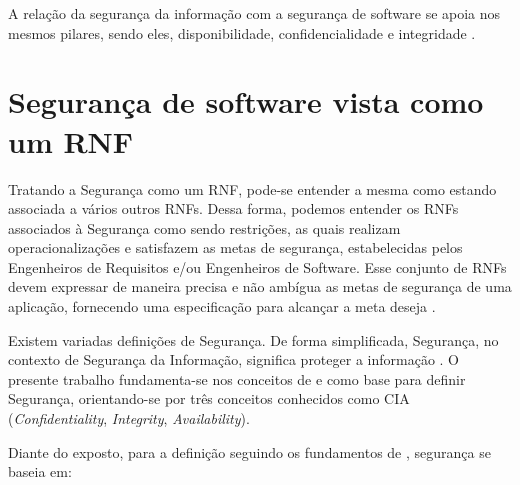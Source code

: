 A relação da segurança da informação com a segurança de software se apoia nos mesmos pilares, sendo eles, disponibilidade, confidencialidade e integridade \cite{chung2012non} \cite{documentation2005information}.

\section{Segurança de software vista como um RNF}
\label{sec:seguranca}

Tratando a Segurança como um RNF, pode-se entender a mesma como estando associada a vários outros RNFs. Dessa forma, podemos entender os RNFs associados à Segurança como sendo restrições, as quais realizam operacionalizações e satisfazem as metas de segurança, estabelecidas pelos Engenheiros de Requisitos e/ou Engenheiros de Software. Esse conjunto de  RNFs devem expressar de maneira precisa e não ambígua as metas de segurança de uma aplicação, fornecendo uma especificação para alcançar a meta deseja \cite{haley2006framework}.  

Existem variadas definições de Segurança. De forma simplificada, Segurança, no contexto de Segurança da Informação, significa proteger a informação \cite{chung2012non}. O presente trabalho fundamenta-se nos conceitos de \cite{chung2012non} e \cite{sullivan2011web} como base para definir Segurança, orientando-se por três conceitos conhecidos como CIA (\textit{Confidentiality}, \textit{Integrity}, \textit{Availability}). 

Diante do exposto, para a definição seguindo os fundamentos de \cite{chung2012non}, segurança se baseia em: 

